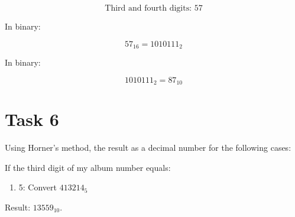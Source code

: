 \documentclass{article}
\begin{document}
\[
\text{Third and fourth digits: } 57
\]

In binary:

\[
57_{16} = 1010111_2
\]

In binary:

\[
1010111_2 = 87_{10}
\]
\section*{Task 6}
Using Horner's method, the result as a decimal number for the following cases:

If the third digit of my album number equals:

\begin{enumerate}
    \item 5: Convert \( 413214_5 \)
\end{enumerate}

Result: \( 13559_{10} \).
\end{document}
